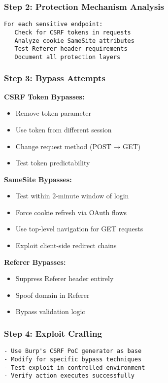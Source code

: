 \documentclass{article}
\begin{document}
\subsubsection*{Step 2: Protection Mechanism Analysis}
\begin{lstlisting}[frame=single, basicstyle=\footnotesize\ttfamily]
For each sensitive endpoint:
   Check for CSRF tokens in requests
   Analyze cookie SameSite attributes
   Test Referer header requirements
   Document all protection layers
\end{lstlisting}

\subsubsection*{Step 3: Bypass Attempts}

\textbf{CSRF Token Bypasses:}
\begin{itemize}
    \item Remove token parameter
    \item Use token from different session
    \item Change request method (POST → GET)
    \item Test token predictability
\end{itemize}

\textbf{SameSite Bypasses:}
\begin{itemize}
    \item Test within 2-minute window of login
    \item Force cookie refresh via OAuth flows
    \item Use top-level navigation for GET requests
    \item Exploit client-side redirect chains
\end{itemize}

\textbf{Referer Bypasses:}
\begin{itemize}
    \item Suppress Referer header entirely
    \item Spoof domain in Referer
    \item Bypass validation logic
\end{itemize}

\subsubsection*{Step 4: Exploit Crafting}
\begin{lstlisting}[frame=single, basicstyle=\footnotesize\ttfamily]
- Use Burp's CSRF PoC generator as base
- Modify for specific bypass techniques
- Test exploit in controlled environment
- Verify action executes successfully
\end{lstlisting}
\end{document}
